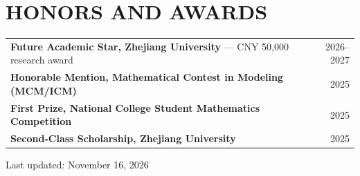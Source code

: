 \documentclass[10pt,letterpaper]{article}
\begin{document}
\section*{HONORS AND AWARDS}
\begin{tabularx}{\textwidth}{@{}Xr@{}}
  \textbf{Future Academic Star, Zhejiang University} --- CNY 50,000 research award & 2026--2027 \\
  \textbf{Honorable Mention, Mathematical Contest in Modeling (MCM/ICM)}  & 2025 \\
  \textbf{First Prize, National College Student Mathematics Competition} & 2025\\
  \textbf{Second-Class Scholarship, Zhejiang University}  & 2025
\end{tabularx}

\par\vspace{12pt}
{\footnotesize Last updated: November 16, 2026}
\end{document}

